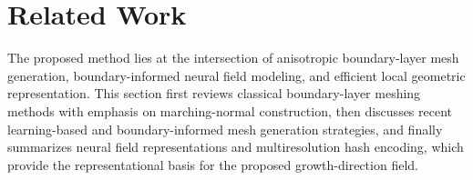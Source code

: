 \documentclass[%
 aip,
 amsmath,amssymb,
 reprint,%
nobibnotes,
]{revtex4-1}
\begin{document}

\section{\label{sec:related_work}Related Work}
The proposed method lies at the intersection of anisotropic boundary-layer mesh generation, boundary-informed neural field modeling, and efficient local geometric representation. This section first reviews classical boundary-layer meshing methods with emphasis on marching-normal construction, then discusses recent learning-based and boundary-informed mesh generation strategies, and finally summarizes neural field representations and multiresolution hash encoding, which provide the representational basis for the proposed growth-direction field.
\end{document}
